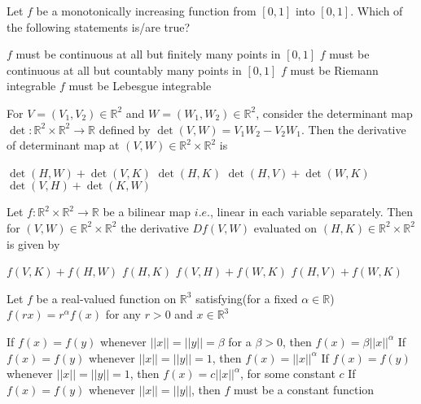 \documentclass[10pt]{exam}
\begin{document}
\begin{questions}
\question 
Let $f$ be a monotonically increasing function from $[0,1]$ into $[0,1]$. Which of the following statements is/are true?

\begin{checkboxes}
\choice $f$ must be continuous at all but finitely many points in $[0,1]$ 
\choice $f$ must be continuous at all but countably many points in $[0,1]$ 
\choice $f$ must be Riemann integrable 
\choice $f$ must be Lebesgue integrable 
\end{checkboxes}


\question
For $V=(V_1,V_2)\in \mathbb{R}^2$ and $W=(W_1,W_2)\in \mathbb{R}^2$, consider the determinant map $\det :\mathbb{R}^2 \times \mathbb{R}^2 \rightarrow \mathbb{R}$ defined by $\det (V,W)=V_1W_2-V_2W_1$. Then the derivative of determinant map at $(V,W)\in \mathbb{R}^2 \times \mathbb{R}^2$ is 

\begin{choices}
\choice $\det (H,W)+\det (V,K)$
\choice $\det (H,K)$
\choice $\det (H,V)+\det (W,K)$
\choice $\det (V,H)+\det (K,W)$  
\end{choices}

\question
Let $f :\mathbb{R}^2 \times \mathbb{R}^2 \rightarrow \mathbb{R}$ be a bilinear map $i.e.$, linear in each variable separately. Then for $(V,W)\in \mathbb{R}^2 \times \mathbb{R}^2$ the derivative $Df(V,W)$ evaluated on $(H,K) \in \mathbb{R}^2 \times \mathbb{R}^2$ is given by

\begin{choices}
\choice $f(V,K)+f(H,W)$
\choice $f(H,K)$
\choice $f(V,H)+f(W,K)$
\choice $f(H,V)+f(W,K)$  
\end{choices}

\question
Let $f$ be a real-valued function on $\mathbb{R}^3$ satisfying(for a fixed $\alpha \in \mathbb{R}$) $f(rx)=r^{\alpha}f(x)$ for any $r>0$ and $x \in \mathbb{R}^3$

\begin{choices}
\choice If $f(x)=f(y)$ whenever $||x||=||y||=\beta$ for a $\beta >0$, then $f(x)= \beta ||x||^{\alpha}$
\choice If $f(x)=f(y)$ whenever $||x||=||y||=1$, then $f(x)=||x||^{\alpha}$
\choice If $f(x)=f(y)$ whenever $||x||=||y||=1$, then $f(x)= c ||x||^{\alpha}$, for some constant $c$
\choice If $f(x)=f(y)$ whenever $||x||=||y||$, then $f$ must be a constant function
\end{choices}


\end{questions}
\end{document}
